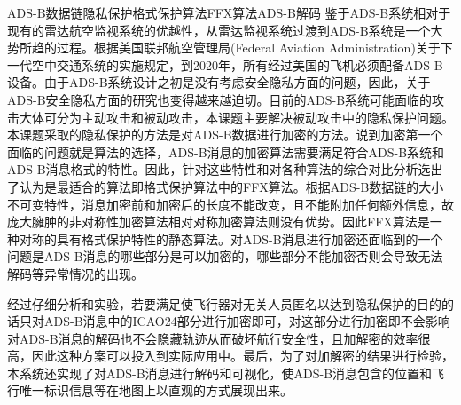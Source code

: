 
\begin{Cabstract}{ADS-B}{数据链隐私保护}{格式保护算法}{FFX算法}{ADS-B解码}
鉴于ADS-B系统相对于现有的雷达航空监视系统的优越性，从雷达监视系统过渡到ADS-B系统是一个大势所趋的过程。根据美国联邦航空管理局(Federal Aviation Administration)关于下一代空中交通系统的实施规定，到2020年，所有经过美国的飞机必须配备ADS-B设备。由于ADS-B系统设计之初是没有考虑安全隐私方面的问题，因此，关于ADS-B安全隐私方面的研究也变得越来越迫切。目前的ADS-B系统可能面临的攻击大体可分为主动攻击和被动攻击，本课题主要解决被动攻击中的隐私保护问题。本课题采取的隐私保护的方法是对ADS-B数据进行加密的方法。说到加密第一个面临的问题就是算法的选择，ADS-B消息的加密算法需要满足符合ADS-B系统和ADS-B消息格式的特性。因此，针对这些特性和对各种算法的综合对比分析选出了认为是最适合的算法即格式保护算法中的FFX算法。根据ADS-B数据链的大小不可变特性，消息加密前和加密后的长度不能改变，且不能附加任何额外信息，故庞大臃肿的非对称性加密算法相对对称加密算法则没有优势。因此FFX算法是一种对称的具有格式保护特性的静态算法。对ADS-B消息进行加密还面临到的一个问题是ADS-B消息的哪些部分是可以加密的，哪些部分不能加密否则会导致无法解码等异常情况的出现。

经过仔细分析和实验，若要满足使飞行器对无关人员匿名以达到隐私保护的目的的话只对ADS-B消息中的ICAO24部分进行加密即可，对这部分进行加密即不会影响对ADS-B消息的解码也不会隐藏轨迹从而破坏航行安全性，且加解密的效率很高，因此这种方案可以投入到实际应用中。最后，为了对加解密的结果进行检验，本系统还实现了对ADS-B消息进行解码和可视化，使ADS-B消息包含的位置和飞行唯一标识信息等在地图上以直观的方式展现出来。
\end{Cabstract}
